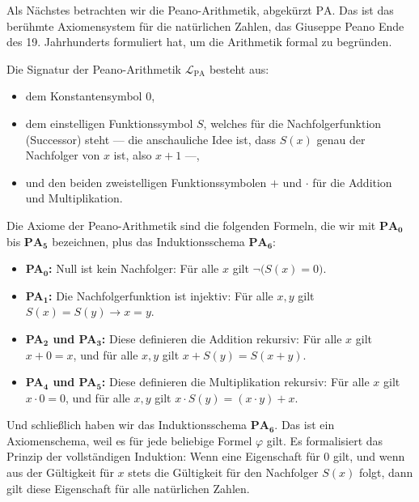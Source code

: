 \begin{spoken-clean}[01:23:42 - 01:27:42]
Als Nächstes betrachten wir die Peano-Arithmetik, abgekürzt $\text{PA}$. Das ist das berühmte Axiomensystem für die natürlichen Zahlen, das Giuseppe Peano Ende des 19. Jahrhunderts formuliert hat, um die Arithmetik formal zu begründen. 

Die Signatur der Peano-Arithmetik $\mathcal{L}_{\text{PA}}$ besteht aus:
\begin{itemize}
    \item dem Konstantensymbol $0$,
    \item dem einstelligen Funktionssymbol $S$, welches für die Nachfolgerfunktion (Successor) steht --- die anschauliche Idee ist, dass $S(x)$ genau der Nachfolger von $x$ ist, also $x + 1$ ---,
    \item und den beiden zweistelligen Funktionssymbolen $+$ und $\cdot$ für die Addition und Multiplikation.
\end{itemize}

Die Axiome der Peano-Arithmetik sind die folgenden Formeln, die wir mit $\mathbf{PA_0}$ bis $\mathbf{PA_5}$ bezeichnen, plus das Induktionsschema $\mathbf{PA_6}$:
\begin{itemize}
    \item \textbf{PA$_{\mathbf{0}}$:} Null ist kein Nachfolger: Für alle $x$ gilt $\neg\bigl(S(x) = 0\bigr)$.
    \item \textbf{PA$_{\mathbf{1}}$:} Die Nachfolgerfunktion ist injektiv: Für alle $x, y$ gilt $S(x) = S(y) \rightarrow x = y$.
    \item \textbf{PA$_{\mathbf{2}}$ und PA$_{\mathbf{3}}$:} Diese definieren die Addition rekursiv: Für alle $x$ gilt $x + 0 = x$, und für alle $x, y$ gilt $x + S(y) = S(x + y)$.
    \item \textbf{PA$_{\mathbf{4}}$ und PA$_{\mathbf{5}}$:} Diese definieren die Multiplikation rekursiv: Für alle $x$ gilt $x \cdot 0 = 0$, und für alle $x, y$ gilt $x \cdot S(y) = (x \cdot y) + x$.
\end{itemize}

Und schließlich haben wir das Induktionsschema $\mathbf{PA_6}$. Das ist ein Axiomenschema, weil es für jede beliebige Formel $\varphi$ gilt. Es formalisiert das Prinzip der vollständigen Induktion: Wenn eine Eigenschaft für $0$ gilt, und wenn aus der Gültigkeit für $x$ stets die Gültigkeit für den Nachfolger $S(x)$ folgt, dann gilt diese Eigenschaft für alle natürlichen Zahlen.
\end{spoken-clean}

